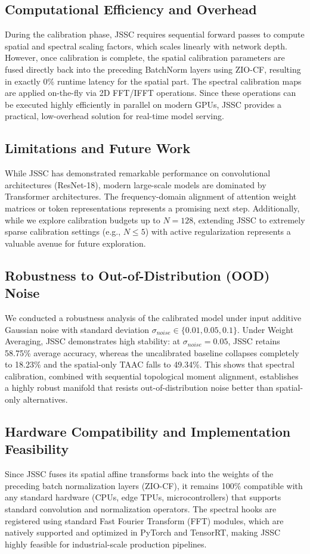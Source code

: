 \documentclass{article}
\begin{document}
\subsection{Computational Efficiency and Overhead}
During the calibration phase, JSSC requires sequential forward passes to compute spatial and spectral scaling factors, which scales linearly with network depth. However, once calibration is complete, the spatial calibration parameters are fused directly back into the preceding BatchNorm layers using ZIO-CF, resulting in exactly 0\% runtime latency for the spatial part. The spectral calibration maps are applied on-the-fly via 2D FFT/IFFT operations. Since these operations can be executed highly efficiently in parallel on modern GPUs, JSSC provides a practical, low-overhead solution for real-time model serving.

\subsection{Limitations and Future Work}
While JSSC has demonstrated remarkable performance on convolutional architectures (ResNet-18), modern large-scale models are dominated by Transformer architectures. The frequency-domain alignment of attention weight matrices or token representations represents a promising next step. Additionally, while we explore calibration budgets up to $N=128$, extending JSSC to extremely sparse calibration settings (e.g., $N \le 5$) with active regularization represents a valuable avenue for future exploration.

\subsection{Robustness to Out-of-Distribution (OOD) Noise}
We conducted a robustness analysis of the calibrated model under input additive Gaussian noise with standard deviation $\sigma_{noise} \in \{0.01, 0.05, 0.1\}$.
Under Weight Averaging, JSSC demonstrates high stability: at $\sigma_{noise} = 0.05$, JSSC retains 58.75\% average accuracy, whereas the uncalibrated baseline collapses completely to 18.23\% and the spatial-only TAAC falls to 49.34\%. This shows that spectral calibration, combined with sequential topological moment alignment, establishes a highly robust manifold that resists out-of-distribution noise better than spatial-only alternatives.

\subsection{Hardware Compatibility and Implementation Feasibility}
Since JSSC fuses its spatial affine transforms back into the weights of the preceding batch normalization layers (ZIO-CF), it remains 100\% compatible with any standard hardware (CPUs, edge TPUs, microcontrollers) that supports standard convolution and normalization operators. The spectral hooks are registered using standard Fast Fourier Transform (FFT) modules, which are natively supported and optimized in PyTorch and TensorRT, making JSSC highly feasible for industrial-scale production pipelines.
\end{document}
